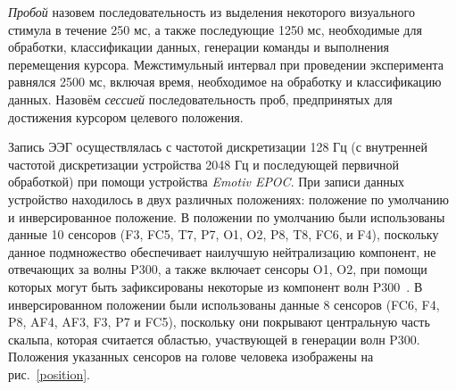 \documentclass[12pt,a4paper,oneside,fleqn,leqno]{article}
\begin{document}
	\par {\it Пробой} назовем последовательность из выделения некоторого визуального стимула в течение 250 мс, а также последующие 1250 мс, необходимые для обработки, классификации данных, генерации команды и выполнения перемещения курсора. Межстимульный интервал при проведении эксперимента равнялся 2500 мс, включая время, необходимое на обработку и классификацию данных. Назовём {\it сессией} последовательность проб, предпринятых для достижения курсором целевого положения.
	\par Запись ЭЭГ осуществлялась с частотой дискретизации 128 Гц (с внутренней частотой дискретизации устройства 2048 Гц и последующей первичной обработкой) при помощи устройства {\it Emotiv EPOC}. При записи данных устройство находилось в двух различных положениях: положение по умолчанию и инверсированное положение. В положении по умолчанию были использованы данные 10 сенсоров (F3, FC5, T7, P7, O1, O2, P8, T8, FC6, и F4), поскольку данное подмножество обеспечивает наилучшую нейтрализацию компонент, не отвечающих за волны P300, а также включает сенсоры O1, O2, при помощи которых могут быть зафиксированы некоторые из компонент волн P300~\cite{ensemble}. В инверсированном положении были использованы данные 8 сенсоров (FC6, F4, P8, AF4, AF3, F3, P7 и FC5), поскольку они покрывают центральную часть скальпа, которая считается областью, участвующей в генерации волн P300. Положения указанных сенсоров на голове человека изображены на рис.~\ref{position}.
\end{document}
